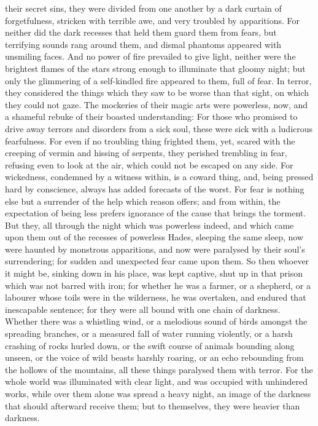 their secret sins, they were divided from one another by a dark curtain
of forgetfulness, stricken with terrible awe, and very troubled by
apparitions.  For neither did the dark recesses that held
them guard them from fears, but terrifying sounds rang around them, and
dismal phantoms appeared with unsmiling faces.  And no power
of fire prevailed to give light, neither were the brightest flames of
the stars strong enough to illuminate that gloomy night; 
but only the glimmering of a self-kindled fire appeared to them, full of
fear. In terror, they considered the things which they saw to be worse
than that sight, on which they could not gaze.  The
mockeries of their magic arts were powerless, now, and a shameful rebuke
of their boasted understanding:  For those who promised to
drive away terrors and disorders from a sick soul, these were sick with
a ludicrous fearfulness.  For even if no troubling thing
frighted them, yet, scared with the creeping of vermin and hissing of
serpents,  they perished trembling in fear, refusing even
to look at the air, which could not be escaped on any side.
 For wickedness, condemned by a witness within, is a coward
thing, and, being pressed hard by conscience, always has added forecasts
of the worst.  For fear is nothing else but a surrender of
the help which reason offers;  and from within, the
expectation of being less prefers ignorance of the cause that brings the
torment.  But they, all through the night which was
powerless indeed, and which came upon them out of the recesses of
powerless Hades, sleeping the same sleep,  now were haunted
by monstrous apparitions, and now were paralysed by their soul's
surrendering; for sudden and unexpected fear came upon them.
 So then whoever it might be, sinking down in his place,
was kept captive, shut up in that prison which was not barred with iron;
 for whether he was a farmer, or a shepherd, or a labourer
whose toils were in the wilderness, he was overtaken, and endured that
inescapable sentence; for they were all bound with one chain of
darkness.  Whether there was a whistling wind, or a
melodious sound of birds amongst the spreading branches, or a measured
fall of water running violently,  or a harsh crashing of
rocks hurled down, or the swift course of animals bounding along unseen,
or the voice of wild beasts harshly roaring, or an echo rebounding from
the hollows of the mountains, all these things paralysed them with
terror.  For the whole world was illuminated with clear
light, and was occupied with unhindered works,  while over
them alone was spread a heavy night, an image of the darkness that
should afterward receive them; but to themselves, they were heavier than
darkness.

